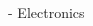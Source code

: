 \begin{cventries}
{\begin{cvitems}
\begin{multicols}{3}
          \item[-] {Electronics}
        \end{multicols}
      \end{cvitems}
    }
\end{cventries}
